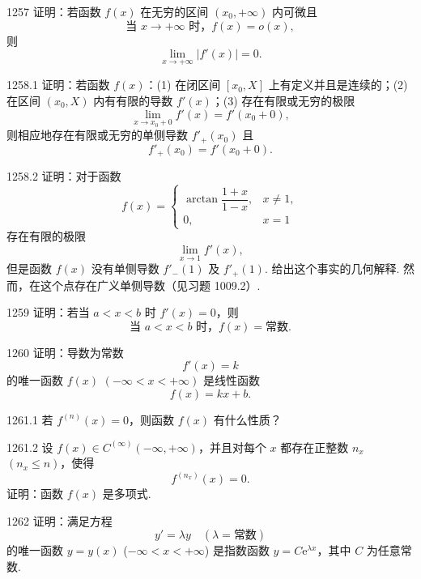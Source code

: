 \begin{prob}[M]{1257}
证明：若函数 $f(x)$ 在无穷的区间 $(x_0, +\infty)$ 内可微且
\[
\text{当 } x \to +\infty \text{ 时，} f(x) = o(x),
\]
则
\[
\lim_{x \to +\infty} |f'(x)| = 0.
\]
\end{prob}

\begin{prob}[M]{1258.1}
证明：若函数 $f(x)$：(1) 在闭区间 $[x_0, X]$ 上有定义并且是连续的；(2) 在区间 $(x_0, X)$ 内有有限的导数 $f'(x)$；(3) 存在有限或无穷的极限
\[
\lim_{x \to x_0 + 0} f'(x) = f'(x_0 + 0),
\]
则相应地存在有限或无穷的单侧导数 $f'_+(x_0)$ 且
\[
f'_+(x_0) = f'(x_0 + 0).
\]
\end{prob}

\begin{prob}[M]{1258.2}
证明：对于函数
\[
f(x) = \begin{cases}
\arctan \dfrac{1 + x}{1 - x}, & x \neq 1, \\
0, & x = 1
\end{cases}
\]
存在有限的极限
\[
\lim_{x \to 1} f'(x),
\]
但是函数 $f(x)$ 没有单侧导数 $f'_-(1)$ 及 $f'_+(1)$. 给出这个事实的几何解释. 然而，在这个点存在广义单侧导数（见习题 1009.2）.
\end{prob}

\begin{prob}[S]{1259}
证明：若当 $a < x < b$ 时 $f'(x) = 0$，则
\[
\text{当 } a < x < b \text{ 时，} f(x) = \text{常数}.
\]
\end{prob}

\begin{prob}[S]{1260}
证明：导数为常数
\[
f'(x) = k
\]
的唯一函数 $f(x)$ $(-\infty < x < +\infty)$ 是线性函数
\[
f(x) = kx + b.
\]
\end{prob}

\begin{prob}[S]{1261.1}
若 $f^{(n)}(x) = 0$，则函数 $f(x)$ 有什么性质？
\end{prob}

\begin{prob}[M]{1261.2}
设 $f(x) \in C^{(\infty)}(-\infty, +\infty)$，并且对每个 $x$ 都存在正整数 $n_x$ $(n_x \leqslant n)$，使得
\[
f^{(n_x)}(x) = 0.
\]
证明：函数 $f(x)$ 是多项式.
\end{prob}

\begin{prob}[M]{1262}
证明：满足方程
\[
y' = \lambda y \quad (\lambda = \text{常数})
\]
的唯一函数 $y = y(x)$ ($-\infty < x < +\infty$) 是指数函数 $y = C\mathrm{e}^{\lambda x}$，其中 $C$ 为任意常数.
\end{prob}

